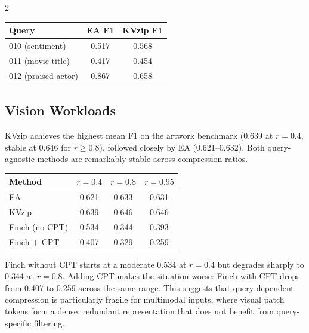 \documentclass[10pt,a4paper]{article}
\begin{document}
\begin{multicols}{2}
\begin{center}
  \centering
  \label{tab:extract-results}
  \begin{tabular}{lcc}
    \toprule
    Query & EA F1 & KVzip F1 \\
    \midrule
    010 (sentiment)     & 0.517 & 0.568 \\
    011 (movie title)   & 0.417 & 0.454 \\
    012 (praised actor) & 0.867 & 0.658 \\
    \bottomrule
  \end{tabular}
\end{center}

\begin{center}
  \centering
  \fbox{\rule{0pt}{4cm}\rule{0.9\columnwidth}{0pt}}
  \label{fig:extract-f1}
\end{center}

\subsection{Vision Workloads}

KVzip achieves the highest mean F1 on the artwork benchmark (0.639 at
$r=0.4$, stable at 0.646 for $r \geq 0.8$), followed closely by EA
(0.621--0.632). Both query-agnostic methods are remarkably stable across
compression ratios.

\begin{center}
  \centering
  \label{tab:artwork-results}
  \begin{tabular}{lccc}
    \toprule
    Method & $r{=}0.4$ & $r{=}0.8$ & $r{=}0.95$ \\
    \midrule
    EA              & 0.621 & 0.633 & 0.631 \\
    KVzip           & 0.639 & 0.646 & 0.646 \\
    Finch (no CPT)  & 0.534 & 0.344 & 0.393 \\
    Finch + CPT     & 0.407 & 0.329 & 0.259 \\
    \bottomrule
  \end{tabular}
\end{center}

Finch without CPT starts at a moderate 0.534 at $r=0.4$ but degrades
sharply to 0.344 at $r=0.8$. Adding CPT makes the situation worse:
Finch with CPT drops from 0.407 to 0.259 across the same range. This
suggests that query-dependent compression is particularly fragile for
multimodal inputs, where visual patch tokens form a dense, redundant
representation that does not benefit from query-specific filtering.


\end{multicols}
\end{document}
